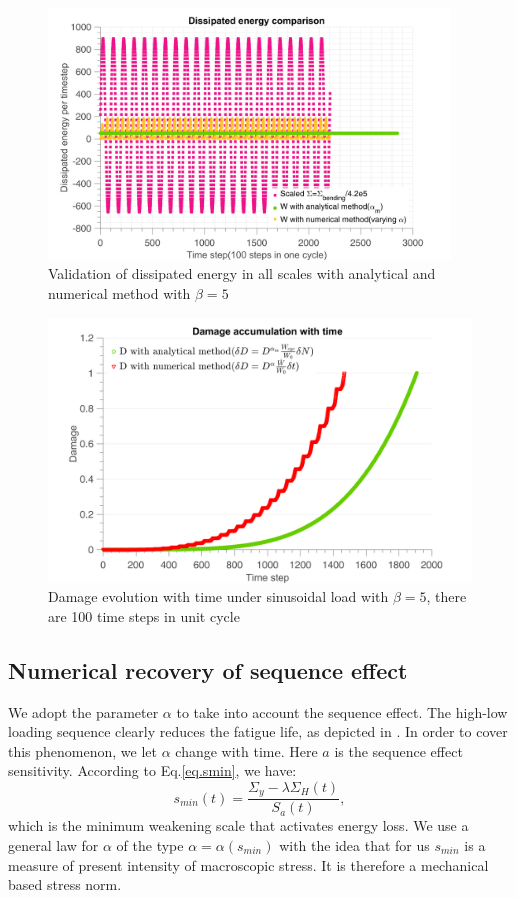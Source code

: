 \begin{figure}[!h]
	\centering
	\includegraphics[width=0.95\textwidth]{figures//W3methods_bigbeta.png} 
	\caption{Validation of dissipated energy in all scales with analytical and numerical method with $\beta=5$ }
	\label{fig.W3methods_bigbeta}
\end{figure}
\begin{figure}[!h]
	\centering
	\includegraphics[width=\textwidth]{figures//damsin_bigbeta.png} 
	\caption{Damage evolution with time under sinusoidal load with $\beta=5$, there are 100 time steps in unit cycle}
	\label{fig.damsin_bigbeta}
\end{figure}

\clearpage
\subsection{Numerical recovery of sequence effect}
We adopt the parameter $\alpha$ to take into account the sequence effect. The high-low loading sequence clearly reduces the fatigue life, as depicted in . In order to cover this phenomenon, we let $\alpha$ change with time. Here $a$ is the sequence effect sensitivity. According to Eq.\eqref{eq.smin}, we have:
$$
s_{min}(t)=\dfrac{\Sigma_y-\lambda \Sigma_H(t)}{S_{a}(t)},
$$
which is the minimum weakening scale that activates energy loss.  We use a general law for $\alpha$ of the type $\alpha = \alpha (s_{min})$ with the idea that for us $s_{min}$ is a measure of present intensity of macroscopic stress. It is therefore a mechanical based stress norm. 

